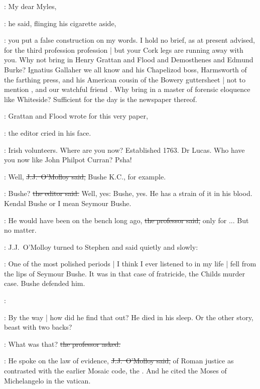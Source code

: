 \jjom:
My dear Myles,

:
he said,
flinging his cigarette aside,

\jjom:
you put a false construction on my words.
I hold no brief,
as at present advised,
for the third profession  profession |
but your Cork legs are running away with you.
Why not bring in Henry Grattan and Flood and Demosthenes and Edmund Burke?
Ignatius Gallaher we all know
and his Chapelizod boss, Harmsworth of the farthing press,
and his American cousin of the Bowery guttersheet |
not to mention ,
and our watchful friend .
Why bring in a master of forensic eloquence like Whiteside?
Sufficient for the day is the newspaper thereof.



\crawford:
Grattan and Flood wrote for this very paper,

:
the editor cried in his face.

\crawford:
Irish volunteers.
Where are you now?
Established 1763.
Dr Lucas.
Who have you now like John Philpot Curran?
Psha!

\jjom:
Well,
\sout{J.J.~O'Molloy said,}
Bushe K.C., for example.

\crawford:
Bushe?
\sout{the editor said.}
Well, yes:
Bushe, yes.
He has a strain of it in his blood.
Kendal Bushe or I mean Seymour Bushe.

\machugh:
He would have been on the bench long ago,
\sout{the professor said,}
only for ...
But no matter.

:
J.J.~O'Molloy turned to Stephen
and said quietly and slowly:

\jjom:
One of the most polished periods |
I think I ever listened to in my life |
fell from the lips of Seymour Bushe.
It was in that case of fratricide,
the Childs murder case.
Bushe defended him.

\StephenInt:
%

\StephenInt:
By the way |
how did he find that out?
He died in his sleep.
Or the other story,
beast with two backs?

\machugh:
What was that?
\sout{the professor asked.}



\jjom:
He spoke on the law of evidence,
\sout{J.J.~O'Molloy said,}
of Roman justice
as contrasted with the earlier Mosaic code,
the .
And he cited the Moses of Michelangelo in the vatican.

